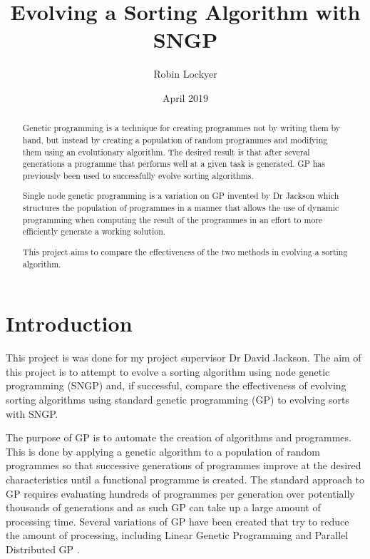 \documentclass{article}
\title{Evolving a Sorting Algorithm with SNGP}
\author{Robin Lockyer}
\date{April 2019}
\affil{University of Liverpool}
\begin{document}
	
	\maketitle	
	
	\begin{abstract}
		
		Genetic programming is a technique for creating programmes not by writing them by hand, but instead by creating a population of random programmes and modifying them using an evolutionary algorithm. The desired result is that after several generations a programme that performs well at a given task is generated. GP has previously been used to successfully evolve sorting algorithms.
		
		Single node genetic programming is a variation on GP invented by Dr Jackson which structures the population of programmes in a manner that allows the use of dynamic programming when computing the result of the programmes in an effort to more efficiently generate a working solution. 
		
		This project aims to compare the effectiveness of the two methods in evolving a sorting algorithm.
		
	\end{abstract}

	\tableofcontents
	
	\section{Introduction}
	
		This project is was done for my project supervisor Dr David Jackson. The aim of this project is to attempt to evolve a sorting algorithm using node genetic programming (SNGP) and, if successful, compare the effectiveness of evolving sorting algorithms using standard genetic programming (GP) to evolving sorts with SNGP.
		
		The purpose of GP is to automate the creation of algorithms and programmes. This is done by applying a genetic algorithm to a population of random programmes so that successive generations of programmes improve at the desired characteristics until a functional programme is created.
		The standard approach to GP requires evaluating hundreds of programmes per generation over potentially thousands of generations and as such GP can take up a large amount of processing time. Several variations of GP have been created that try to reduce the amount of processing, including Linear Genetic Programming and Parallel Distributed GP \cite{poli_field_2008}.
		
\end{document}
